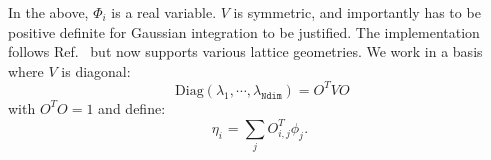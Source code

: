 In the above,   $\Phi_i $ is a  real  variable.  $V$ is symmetric, and importantly has to be  positive definite  for Gaussian integration to be justified.   
The implementation follows Ref.~\cite{Hohenadler14}  but now supports various lattice geometries.     We work in a basis where  $V$   is diagonal: 
\begin{equation}
	\text{ Diag}  \left( \lambda_1, \cdots ,\lambda_{\texttt{Ndim}} \right)    =  O^{T} V O 
\end{equation}
 with $O^T O = 1$  and define:
 \begin{equation}
 	  \eta_{i}^{\phantom\dagger}   =  \sum_{j} O^{T}_{i,j} \phi_{j}^{\phantom\dagger}.
 \end{equation}
  



